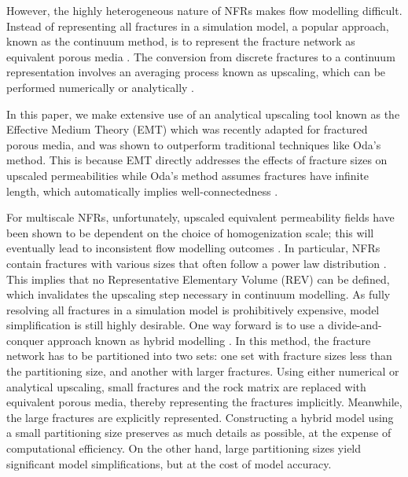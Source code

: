 \documentclass[draft]{agujournal2018}
\begin{document}
However, the highly heterogeneous nature of NFRs makes flow modelling difficult. Instead of representing all fractures in a simulation model, a popular approach, known as the continuum method, is to represent the fracture network as equivalent porous media \citep[e.g.][]{Berre2018a, Lemonnier2010a, Lemonnier2010, Warren1963, Yan2016}. The conversion from discrete fractures to a continuum representation involves an averaging process known as upscaling, which can be performed numerically or analytically \citep{Durlofsky1991,Oda1985,Renard1997,Saevik2013}. 

In this paper, we make extensive use of an analytical upscaling tool known as the Effective Medium Theory (EMT) which was recently adapted for fractured porous media, and was shown to outperform traditional techniques like Oda's method. This is because EMT directly addresses the effects of fracture sizes on upscaled permeabilities while Oda's method assumes fractures have infinite length, which automatically implies well-connectedness \citep{Oda1985, Saevik2013, Saevik2014}.

For multiscale NFRs, unfortunately, upscaled equivalent permeability fields have been shown to be dependent on the choice of homogenization scale; this will eventually lead to inconsistent flow modelling outcomes \citep{Azizmohammadi2017}. In particular, NFRs contain fractures with various sizes that often follow a power law distribution \citep{Bonnet2001}. This implies that no Representative Elementary Volume (REV) can be defined, which invalidates the upscaling step necessary in continuum modelling. As fully resolving all fractures in a simulation model is prohibitively expensive, model simplification is still highly desirable. One way forward is to use a divide-and-conquer approach known as hybrid modelling \citep{Berkowitz2002, Bourbiaux2010}. In this method, the fracture network has to be partitioned into two sets: one set with fracture sizes less than the partitioning size, and another with larger fractures. Using either numerical or analytical upscaling, small fractures and the rock matrix are replaced with equivalent porous media, thereby representing the fractures implicitly. Meanwhile, the large fractures are explicitly represented. Constructing a hybrid model using a small partitioning size preserves as much details as possible, at the expense of computational efficiency. On the other hand, large partitioning sizes yield significant model simplifications, but at the cost of model accuracy.
\end{document}
